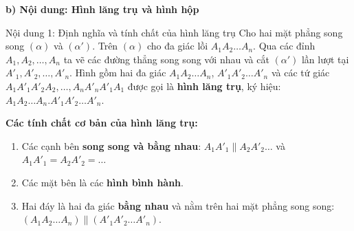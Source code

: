 \documentclass[12pt, a4paper]{article}
\begin{document}
\noindent \textbf{b) Nội dung: Hình lăng trụ và hình hộp}
\begin{pedabox}{Nội dung 1: Định nghĩa và tính chất của hình lăng trụ}
Cho hai mặt phẳng song song $(\alpha)$ và $(\alpha')$. Trên $(\alpha)$ cho đa giác lồi $A_1A_2\dots A_n$. Qua các đỉnh $A_1, A_2, \dots, A_n$ ta vẽ các đường thẳng song song với nhau và cắt $(\alpha')$ lần lượt tại $A'_1, A'_2, \dots, A'_n$.
Hình gồm hai đa giác $A_1A_2\dots A_n$, $A'_1A'_2\dots A'_n$ và các tứ giác $A_1A'_1A'_2A_2, \dots, A_nA'_nA'_1A_1$ được gọi là \textbf{hình lăng trụ}, ký hiệu: $A_1A_2\dots A_n.A'_1A'_2\dots A'_n$.
\begin{center}
\end{center}
\textbf{Các tính chất cơ bản của hình lăng trụ:}
\begin{enumerate}[leftmargin=0.6cm]
    \item Các cạnh bên \textbf{song song và bằng nhau}: $A_1A'_1 \parallel A_2A'_2 \dots$ và $A_1A'_1 = A_2A'_2 = \dots$
    \item Các mặt bên là các \textbf{hình bình hành}.
    \item Hai đáy là hai đa giác \textbf{bằng nhau} và nằm trên hai mặt phẳng song song: $(A_1A_2\dots A_n) \parallel (A'_1A'_2\dots A'_n)$.
\end{enumerate}
\end{pedabox}
\end{document}
